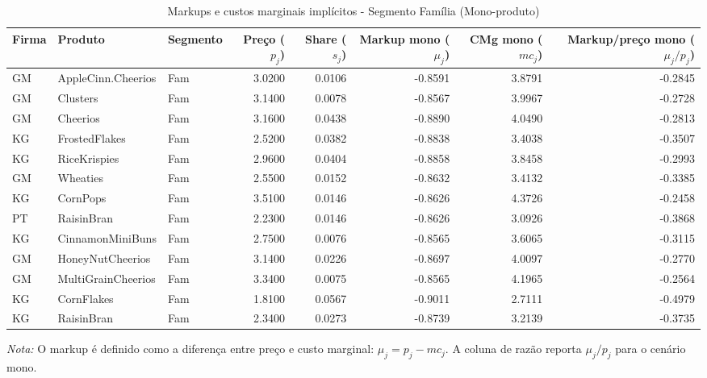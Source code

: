 \begingroup
\begin{table}[H]
\centering
\caption{Markups e custos marginais implícitos - Segmento Família (Mono-produto)}
\label{tab:markups-fam-mono}
\scriptsize
\setlength{\tabcolsep}{3pt}
\renewcommand{\arraystretch}{1.05}
\begin{tabular}{@{}llp{}rrrrr@{}}
\toprule
Firma & Produto & Segmento & Preço ($p_j$) & Share ($s_j$) & Markup mono ($\mu_j$) & CMg mono ($mc_j$) & Markup/preço mono ($\mu_j/p_j$) \\
\midrule
GM & AppleCinn.Cheerios & Fam & 3.0200 & 0.0106 & -0.8591 & 3.8791 & -0.2845 \\
GM & Clusters & Fam & 3.1400 & 0.0078 & -0.8567 & 3.9967 & -0.2728 \\
GM & Cheerios & Fam & 3.1600 & 0.0438 & -0.8890 & 4.0490 & -0.2813 \\
KG & FrostedFlakes & Fam & 2.5200 & 0.0382 & -0.8838 & 3.4038 & -0.3507 \\
KG & RiceKrispies & Fam & 2.9600 & 0.0404 & -0.8858 & 3.8458 & -0.2993 \\
GM & Wheaties & Fam & 2.5500 & 0.0152 & -0.8632 & 3.4132 & -0.3385 \\
KG & CornPops & Fam & 3.5100 & 0.0146 & -0.8626 & 4.3726 & -0.2458 \\
PT & RaisinBran & Fam & 2.2300 & 0.0146 & -0.8626 & 3.0926 & -0.3868 \\
KG & CinnamonMiniBuns & Fam & 2.7500 & 0.0076 & -0.8565 & 3.6065 & -0.3115 \\
GM & HoneyNutCheerios & Fam & 3.1400 & 0.0226 & -0.8697 & 4.0097 & -0.2770 \\
GM & MultiGrainCheerios & Fam & 3.3400 & 0.0075 & -0.8565 & 4.1965 & -0.2564 \\
KG & CornFlakes & Fam & 1.8100 & 0.0567 & -0.9011 & 2.7111 & -0.4979 \\
KG & RaisinBran & Fam & 2.3400 & 0.0273 & -0.8739 & 3.2139 & -0.3735 \\
\bottomrule
\end{tabular}

\vspace{0.3em}
\scriptsize
\textit{Nota:} O markup é definido como a diferença entre preço e custo marginal: $\mu_j=p_j-mc_j$. A coluna de razão reporta $\mu_j/p_j$ para o cenário mono.
\end{table}
\endgroup


